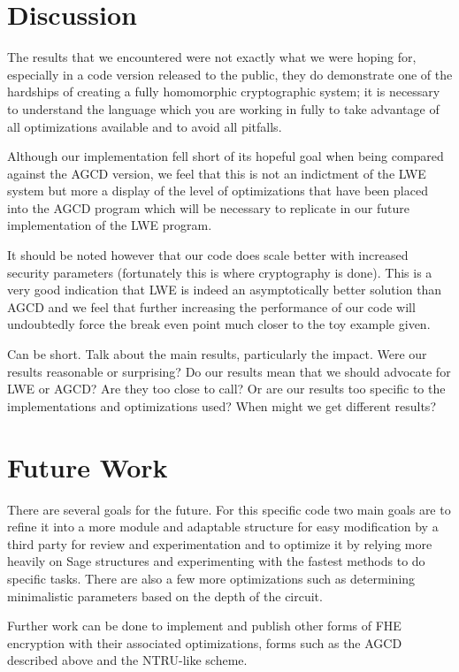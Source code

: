 \documentclass[letterpaper,twocolumn,10pt]{article}
\begin{document}
\section{Discussion}
The results that we encountered were not exactly what we were hoping for, especially in a code version released to the public, they do demonstrate one of the hardships of creating a fully homomorphic cryptographic system; it is necessary to understand the language which you are working in fully to take advantage of all optimizations available and to avoid all pitfalls.

Although our implementation fell short of its hopeful goal when being compared against the AGCD version, we feel that this is not an indictment of the LWE system but more a display of the level of optimizations that have been placed into the AGCD program which will be necessary to replicate in our future implementation of the LWE program.

It should be noted however that our code does scale better with increased security parameters (fortunately this is where cryptography is done). This is a very good indication that LWE is indeed an asymptotically better solution than AGCD and we feel that further increasing the performance of our code will undoubtedly force the break even point much closer to the toy example given.

Can be short. Talk about the main results, particularly the impact. Were our results reasonable or surprising? Do our results mean that we should advocate for LWE or AGCD? Are they too close to call? Or are our results too specific to the implementations and optimizations used? When might we get different results?


\section{Future Work}
There are several goals for the future. For this specific code two main goals are to refine it into a more module and adaptable structure for easy modification by a third party for review and experimentation and to optimize it by relying more heavily on Sage structures and experimenting with the fastest methods to do specific tasks. There are also a few more optimizations such as determining minimalistic parameters based on the depth of the circuit. 

Further work can be done to implement and publish other forms of FHE encryption with their associated optimizations, forms such as the AGCD described above and the NTRU-like scheme.
\end{document}
